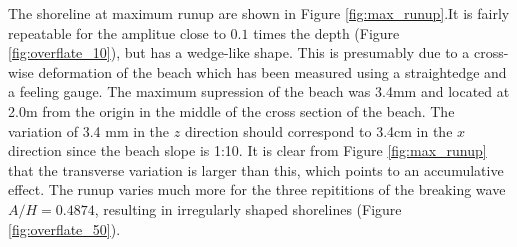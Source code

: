 \documentclass[a4paper, 11pt, english, twoside, openright]{article}
\begin{document}
The shoreline at maximum runup are shown in Figure \ref{fig:max_runup}.It is fairly repeatable for the amplitue close to $0.1$ times the 
depth (Figure \ref{fig:overflate_10}), but has a wedge-like shape. 
 This is presumably due to a cross-wise deformation  of the beach 
which has been measured using a straightedge and a feeling gauge. 
The maximum supression of the beach was 3.4mm and located at 2.0m from the 
origin in the middle of the cross section of the beach. The variation
 of 3.4 mm in the $z$ direction should correspond to 3.4cm in the $x$ 
direction since the beach slope is 1:10. It is clear from Figure 
\ref{fig:max_runup} that the transverse variation is larger than this, 
which points to  an accumulative effect. The  runup   varies much more for the three repititions of the breaking wave $A/H=0.4874$,
resulting in irregularly shaped shorelines  (Figure \ref{fig:overflate_50}).
\end{document}
